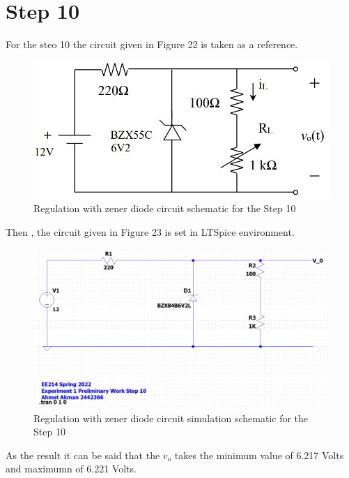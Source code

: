 \documentclass[letterpaper,12pt]{article}
\begin{document}
\section{Step 10}
For the steo 10 the circuit given in Figure 22 is taken as a reference.
\begin{figure}[H]
    \centering
   \includegraphics[width=1\textwidth]{10_1.png}
   \caption{Regulation with zener diode circuit schematic for the Step 10}
\end{figure} 
Then , the circuit given in Figure 23 is set in LTSpice environment.
\begin{figure}[H]
    \centering
   \includegraphics[width=1\textwidth]{10SCH.png}
   \caption{Regulation with zener diode circuit simulation schematic for the Step 10}
\end{figure} 

As the result it can be said that the \(v_o\) takes the minimum value of 6.217 Volts and maximumn of 6.221 Volts.
\end{document}
